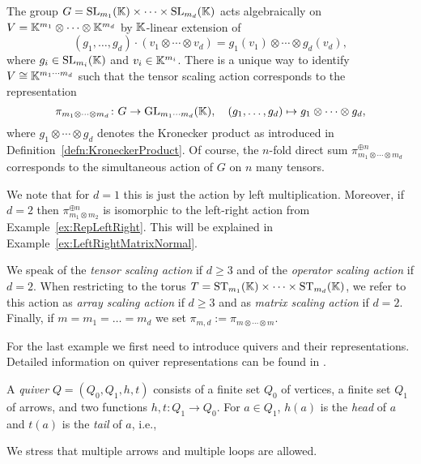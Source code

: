 \begin{example} \label{ex:RepTensorScaling}
	The group $G = \operatorname{SL}_{m_1}(\mathbb K) \times \cdots \times \operatorname{SL}_{m_d}(\mathbb K)$  acts algebraically on $V = \mathbb K^{m_1} \otimes \cdots \otimes \mathbb K^{m_d}$ by $\mathbb K$-linear extension of
		\[ (g_1, \ldots, g_d) \cdot (v_1 \otimes \cdots \otimes v_d) = g_1(v_1) \otimes \cdots \otimes g_d(v_d), \]
	where $g_i \in \operatorname{SL}_{m_i}(\mathbb K)$ and $v_i \in \mathbb K^{m_i}$. There is a unique way to identify $V \cong \mathbb K^{m_1 \cdots m_d}$ such that the tensor scaling action corresponds to the representation
		\[ \pi_{m_1 \otimes \cdots \otimes m_d} \colon G \to \operatorname{GL}_{m_1 \cdots m_d}(\mathbb K), \quad (g_1,\ldots,g_d) \mapsto g_1 \otimes \cdots \otimes g_d, \]
	where $g_1 \otimes \cdots \otimes g_d$ denotes the Kronecker product as introduced in Definition~\ref{defn:KroneckerProduct}.
	Of course, the $n$-fold direct sum $\pi_{m_1 \otimes \cdots \otimes m_d}^{\oplus n}$ corresponds to the simultaneous action of $G$ on $n$ many tensors.
	
	We note that for $d=1$ this is just the action by left multiplication.
	Moreover, if $d=2$ then $\pi_{m_1 \otimes m_2}^{\oplus n}$ is isomorphic to the left-right action from Example~\ref{ex:RepLeftRight}. This will be explained in Example~\ref{ex:LeftRightMatrixNormal}.
	
	We speak of the \emph{tensor scaling action} if $d \geq 3$ and of the \emph{operator scaling action} if $d=2$. When restricting to the torus $T = \operatorname{ST}_{m_1}(\mathbb K) \times \cdots \times \operatorname{ST}_{m_d}(\mathbb K)$, we refer to this action as \emph{array scaling action} if $d \geq 3$ and as \emph{matrix scaling action} if $d=2$.
	Finally, if $m = m_1 = \ldots = m_d$ we set $\pi_{m,d} := \pi_{m \otimes \cdots \otimes m}$.
	\hfill\exSymbol
\end{example}

For the last example we first need to introduce quivers and their representations. Detailed information on quiver representations can be found in \cite{DerksenWeymanBook}.

\begin{defn} \label{defn:Quiver}
	A \emph{quiver} $Q = (Q_0,Q_1,h,t)$ consists of a finite set $Q_0$ of vertices, a finite set $Q_1$ of arrows, and two functions $h, t \colon Q_1 \to Q_0$. For $a \in Q_1$, $h(a)$ is the \emph{head} of $a$ and $t(a)$ is the \emph{tail} of $a$, i.e.,
		\begin{center}
		\end{center}
	We stress that multiple arrows and multiple loops are allowed.
	\hfill{}
\end{defn}

